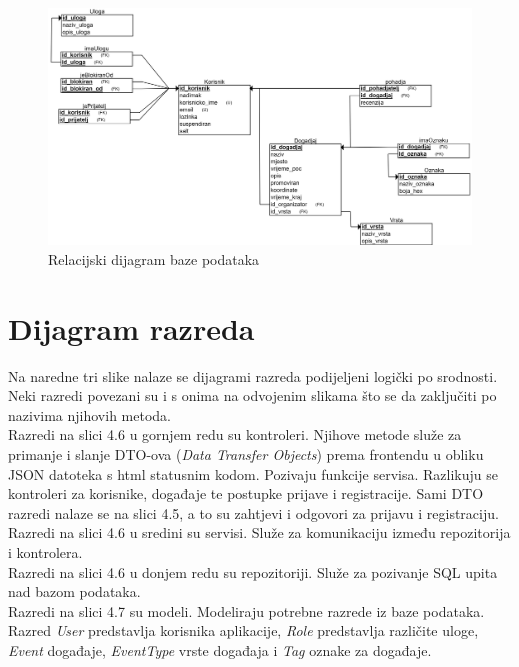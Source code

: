 			\begin{figure}[H]
				\includegraphics[width=\textwidth]{dijagrami/Baza podataka/REL shema.png}
				\caption{Relacijski dijagram baze podataka}
			\end{figure}
				
			\vfill
			\clearpage
			
			\eject
			
			
		\section{Dijagram razreda}
			
			\indent Na naredne tri slike nalaze se dijagrami razreda podijeljeni logički po srodnosti. Neki razredi povezani su i s onima na odvojenim slikama što se da zaključiti po nazivima njihovih metoda. \\
			
			\indent Razredi na slici 4.6 u gornjem redu su kontroleri. Njihove metode služe za primanje i slanje DTO-ova (\textit{Data Transfer Objects}) prema frontendu u obliku JSON datoteka s html statusnim kodom. Pozivaju funkcije servisa. Razlikuju se kontroleri za korisnike, događaje te postupke prijave i registracije. Sami DTO razredi nalaze se na slici 4.5, a to su zahtjevi i odgovori za prijavu i registraciju. \\
			
			\indent Razredi na slici 4.6 u sredini su servisi. Služe za komunikaciju između repozitorija i kontrolera. \\
			
			\indent Razredi na slici 4.6 u donjem redu su repozitoriji. Služe za pozivanje SQL upita nad bazom podataka. \\
			
			\indent Razredi na slici 4.7 su modeli. Modeliraju potrebne razrede iz baze podataka. Razred \textit{User} predstavlja korisnika aplikacije, \textit{Role} predstavlja različite uloge, \textit{Event} događaje, \textit{EventType} vrste događaja i \textit{Tag} oznake za događaje.
			
